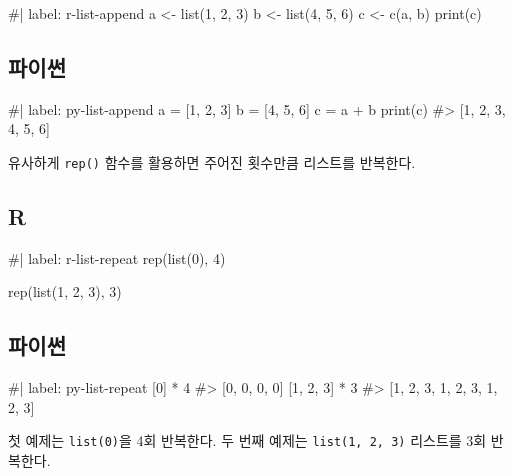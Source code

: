 \documentclass[
  letterpaper,
]{book}
\newenvironment{Shaded}{\begin{snugshade}}{\end{snugshade}}
\newcommand{\NormalTok}[1]{\textcolor[rgb]{0.00,0.23,0.31}{#1}}
\begin{document}
\begin{Shaded}
\begin{Highlighting}[]
\NormalTok{\#| label: r{-}list{-}append}
\NormalTok{a \textless{}{-} list(1, 2, 3)}
\NormalTok{b \textless{}{-} list(4, 5, 6)}
\NormalTok{c \textless{}{-} c(a, b)}
\NormalTok{print(c)}
\end{Highlighting}
\end{Shaded}

\subsection{파이썬}

\begin{Shaded}
\begin{Highlighting}[]
\NormalTok{\#| label: py{-}list{-}append}
\NormalTok{a = [1, 2, 3]}
\NormalTok{b = [4, 5, 6]}
\NormalTok{c = a + b}
\NormalTok{print(c)}
\NormalTok{\#\textgreater{} [1, 2, 3, 4, 5, 6]}
\end{Highlighting}
\end{Shaded}

유사하게 \texttt{rep()} 함수를 활용하면 주어진 횟수만큼 리스트를
반복한다.  

\subsection{R}

\begin{Shaded}
\begin{Highlighting}[]
\NormalTok{\#| label: r{-}list{-}repeat}
\NormalTok{rep(list(0), 4)}

\NormalTok{rep(list(1, 2, 3), 3)}
\end{Highlighting}
\end{Shaded}

\subsection{파이썬}

\begin{Shaded}
\begin{Highlighting}[]
\NormalTok{\#| label: py{-}list{-}repeat}
\NormalTok{[0] * 4}
\NormalTok{\#\textgreater{} [0, 0, 0, 0]}
\NormalTok{[1, 2, 3] * 3}
\NormalTok{\#\textgreater{} [1, 2, 3, 1, 2, 3, 1, 2, 3]}
\end{Highlighting}
\end{Shaded}

첫 예제는 \texttt{list(0)}을 4회 반복한다. 두 번째 예제는
\texttt{list(1,\ 2,\ 3)} 리스트를 3회 반복한다.
\end{document}
